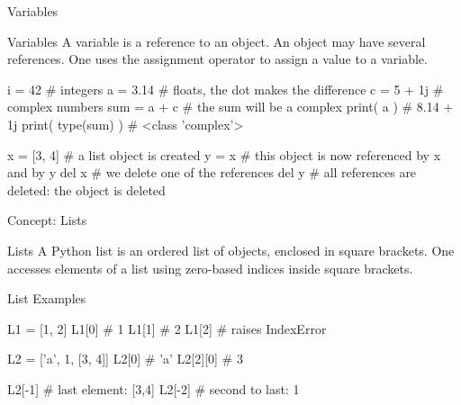 \documentclass[hyperref={pdfpagelabels=false},table, handout]{beamer}
\begin{document}
\begin{frame}[fragile]{Variables}
\begin{block}{Variables}
A variable is a \alert{reference} to an object.
An object may have several references.
One uses the \alert{assignment operator} \code{=} to assign a value to a variable.
\end{block}

\vskip -5pt

\begin{example}
\begin{python}
i = 42      # integers
a = 3.14    # floats, the dot makes the difference
c = 5 + 1j  # complex numbers
sum = a + c # the sum will be a complex
print( a )         #  8.14 + 1j
print( type(sum) ) #  <class 'complex'>
\end{python}
\end{example}

\pause
\vskip -5pt

\begin{example}
\begin{python}
x = [3, 4] # a list object is created
y = x # this object is now referenced by x and by y
del x # we delete one of the references
del y # all references are deleted: the object is deleted
\end{python}
\end{example}
\end{frame}



\begin{frame}[fragile]{Concept: Lists}
\begin{block}{Lists}
A Python list is an \alert{ordered} list of objects, enclosed in square brackets. One accesses elements of a list using \alert{zero-based} indices inside square brackets.
\end{block}
\end{frame}

\begin{frame}[fragile]{List Examples}
\begin{example}
\begin{python}
L1 = [1, 2]
L1[0] # 1
L1[1] # 2
L1[2] # raises IndexError

L2 = ['a', 1, [3, 4]]
L2[0]    # 'a'
L2[2][0] # 3

L2[-1] # last element: [3,4]
L2[-2] # second to last: 1
\end{python}
\end{example}
\end{frame}
\end{document}
